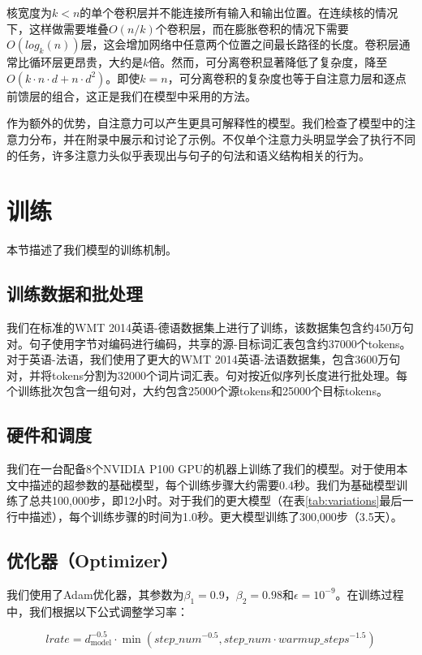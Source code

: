 \documentclass[lang=cn,a4paper,newtx]{elegantpaper}
\newcommand{\dmodel}{d_{\text{model}}}
\begin{document}
核宽度为$k < n$的单个卷积层并不能连接所有输入和输出位置。在连续核的情况下，这样做需要堆叠$O(n/k)$个卷积层，而在膨胀卷积的情况下需要$O(log_k(n))$层，这会增加网络中任意两个位置之间最长路径的长度。卷积层通常比循环层更昂贵，大约是$k$倍。然而，可分离卷积显著降低了复杂度，降至$O(k \cdot n \cdot d + n \cdot d^2)$。即使$k=n$，可分离卷积的复杂度也等于自注意力层和逐点前馈层的组合，这正是我们在模型中采用的方法。

作为额外的优势，自注意力可以产生更具可解释性的模型。我们检查了模型中的注意力分布，并在附录中展示和讨论了示例。不仅单个注意力头明显学会了执行不同的任务，许多注意力头似乎表现出与句子的句法和语义结构相关的行为。

\section{训练}

本节描述了我们模型的训练机制。

\subsection{训练数据和批处理}

我们在标准的WMT 2014英语-德语数据集上进行了训练，该数据集包含约450万句对。句子使用字节对编码进行编码，共享的源-目标词汇表包含约37000个tokens。对于英语-法语，我们使用了更大的WMT 2014英语-法语数据集，包含3600万句对，并将tokens分割为32000个词片词汇表。句对按近似序列长度进行批处理。每个训练批次包含一组句对，大约包含25000个源tokens和25000个目标tokens。

\subsection{硬件和调度}

我们在一台配备8个NVIDIA P100 GPU的机器上训练了我们的模型。对于使用本文中描述的超参数的基础模型，每个训练步骤大约需要0.4秒。我们为基础模型训练了总共100,000步，即12小时。对于我们的更大模型（在表\ref{tab:variations}最后一行中描述），每个训练步骤的时间为1.0秒。更大模型训练了300,000步（3.5天）。

\subsection{优化器（Optimizer）}

我们使用了Adam优化器，其参数为$\beta_1=0.9$，$\beta_2=0.98$和$\epsilon=10^{-9}$。在训练过程中，我们根据以下公式调整学习率：

\begin{equation}
lrate = \dmodel^{-0.5} \cdot
  \min({step\_num}^{-0.5},
    {step\_num} \cdot {warmup\_steps}^{-1.5})
\end{equation}
\end{document}
